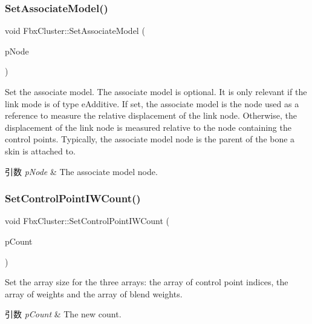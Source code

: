 \subsubsection{\texorpdfstring{Set\+Associate\+Model()}{SetAssociateModel()}}
{\footnotesize\ttfamily void Fbx\+Cluster\+::\+Set\+Associate\+Model (\begin{DoxyParamCaption}\item[{\hyperlink{class_fbx_node}{Fbx\+Node} $\ast$}]{p\+Node }\end{DoxyParamCaption})}

Set the associate model. The associate model is optional. It is only relevant if the link mode is of type e\+Additive. If set, the associate model is the node used as a reference to measure the relative displacement of the link node. Otherwise, the displacement of the link node is measured relative to the node containing the control points. Typically, the associate model node is the parent of the bone a skin is attached to. 
\begin{DoxyParams}{引数}
{\em p\+Node} & The associate model node. \\
\hline
\end{DoxyParams}
\mbox{\label{class_fbx_cluster_a4772d095f168a919e12b03598219cf05}} 
\subsubsection{\texorpdfstring{Set\+Control\+Point\+I\+W\+Count()}{SetControlPointIWCount()}}
{\footnotesize\ttfamily void Fbx\+Cluster\+::\+Set\+Control\+Point\+I\+W\+Count (\begin{DoxyParamCaption}\item[{int}]{p\+Count }\end{DoxyParamCaption})}

Set the array size for the three arrays\+: the array of control point indices, the array of weights and the array of blend weights. 
\begin{DoxyParams}{引数}
{\em p\+Count} & The new count. \\
\hline
\end{DoxyParams}
\mbox{\label{class_fbx_cluster_ac47ba1185bc9bb341636dbaf43f209ff}} 

